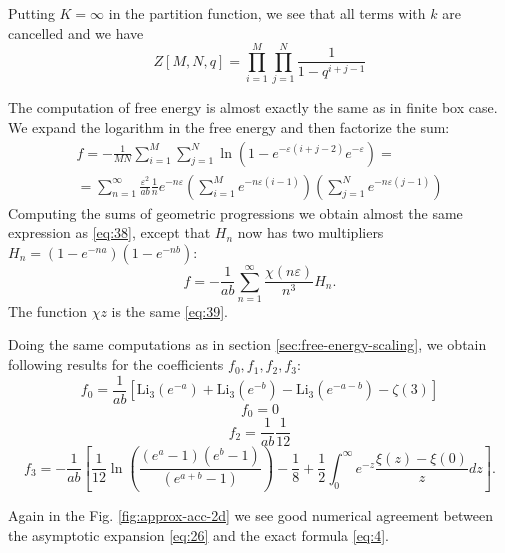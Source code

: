 \documentclass{article}
\newcommand{\Li}{\mathrm{Li}}
\begin{document}
Putting $K=\infty$ in the partition function, we see that all terms with $k$ are cancelled and we have
\begin{equation}
  \label{eq:3}
  Z[M,N,q]=\prod_{i=1}^{M}\prod_{j=1}^{N}\frac{1}{1-q^{i+j-1}}
\end{equation}

The computation of free energy is almost exactly the same as in finite box case. We expand the
logarithm in the free energy and then factorize the sum:
\begin{multline}
  \label{eq:4}
  f=-\frac{1}{MN}\sum_{i=1}^{M}\sum_{j=1}^{N}\ln\left(1-e^{-\varepsilon(i+j-2)}e^{-\varepsilon}\right)=\\
  =\sum_{n=1}^{\infty}\frac{\varepsilon^{2}}{ab}\frac{1}{n}e^{-n\varepsilon}\left(\sum_{i=1}^{M}e^{-n\varepsilon(i-1)}\right)
  \left(\sum_{j=1}^{N}e^{-n\varepsilon(j-1)}\right)
\end{multline}
Computing the sums of geometric progressions we obtain almost the same expression as \eqref{eq:38},
except that $H_{n}$ now has two multipliers $H_{n} =\left(1-e^{-na}\right)\left(1-e^{-nb}\right)$:
\begin{equation}
  \label{eq:5}
  f=-\frac{1}{ab} \sum_{n=1}^{\infty}\frac{\chi(n\varepsilon)}{n^{3}} H_{n}.
\end{equation}
The function $\chi{z}$ is the same \eqref{eq:39}.

Doing the same computations as in section \ref{sec:free-energy-scaling}, we obtain following results
for the coefficients $f_{0}, f_{1}, f_{2}, f_{3}$:
\begin{equation}
  \label{eq:6}
  f_{0}=\frac{1}{ab}\left[\Li_{3}(e^{-a})+\Li_{3}(e^{-b})-
    \Li_{3}(e^{-a-b})-\zeta(3)\right]
\end{equation}
\begin{equation}
  \label{eq:8}
  f_{0}=0
\end{equation}
\begin{equation}
  \label{eq:9}
  f_{2}=\frac{1}{ab}\frac{1}{12}
\end{equation}
\begin{equation}
  \label{eq:11}
  f_{3}=-\frac{1}{ab}\left[\frac{1}{12}\ln\left(\frac{(e^{a}-1)(e^{b}-1)}{(e^{a+b}-1)}\right)-\frac{1}{8}+ \frac{1}{2}\int_{0}^{\infty} e^{-z}\frac{\xi(z)-\xi(0)}{z} dz
    \right].
\end{equation}

Again in the Fig. \ref{fig:approx-acc-2d} we see good numerical agreement between the asymptotic
expansion \eqref{eq:26} and the exact formula \eqref{eq:4}.
\end{document}
